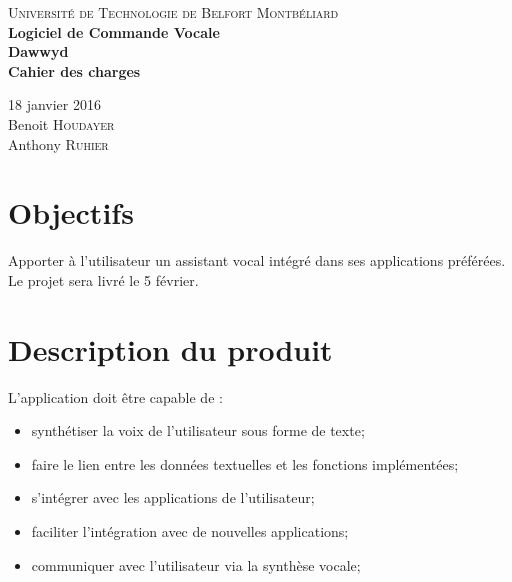 \documentclass[12pt]{article}
\begin{document}
\begin{titlepage}
\begin{center}

\textsc{\large Université de Technologie de Belfort Montbéliard}\\[4cm]

{ \huge \bfseries Logiciel de Commande Vocale\\[0.3em] Dawwyd\\[1em]Cahier des charges}\\[4cm]

{
\begin{large}
\setlength{\baselineskip}{1.6\baselineskip}

\vspace{5cm}
18 janvier 2016\\[2em]
Benoit \textsc{Houdayer}\\
Anthony \textsc{Ruhier}\\[2em]

\end{large}
}

\vfill

\end{center}
\end{titlepage}


	\section{Objectifs}

Apporter à l'utilisateur un assistant vocal intégré dans ses applications
préférées. Le projet sera livré le 5 février.

	\section{Description du produit}

L'application doit être capable de :
\begin{itemize}
    \item synthétiser la voix de l'utilisateur sous forme de texte;
    \item faire le lien entre les données textuelles et les fonctions
        implémentées;
    \item s'intégrer avec les applications de l'utilisateur;
    \item faciliter l'intégration avec de nouvelles applications;
    \item communiquer avec l'utilisateur via la synthèse vocale;
\end{itemize}
\end{document}
